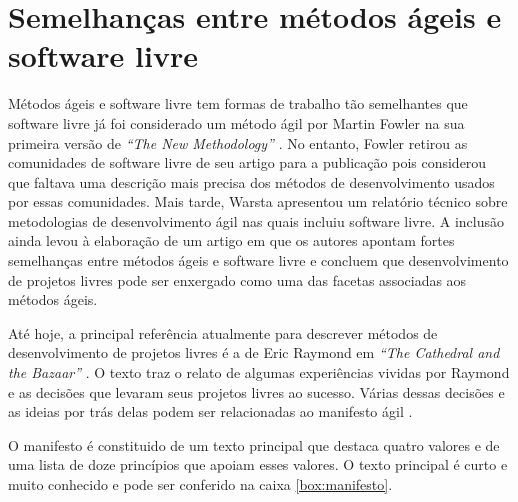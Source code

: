 \chapter{Semelhanças entre métodos ágeis e software livre}
\label{cap:semelhancas}

Métodos ágeis e software livre tem formas de trabalho tão semelhantes
que software livre já foi considerado um método ágil por Martin Fowler
na sua primeira versão de \emph{``The New Methodology''}
\cite{Fowler00orig}. No entanto, Fowler retirou as comunidades de
software livre de seu artigo para a publicação pois considerou que
faltava uma descrição mais precisa dos métodos de desenvolvimento
usados por essas comunidades. Mais tarde, Warsta \cite{Warsta2002}
apresentou um relatório técnico sobre metodologias de desenvolvimento
ágil nas quais incluiu software livre. A inclusão ainda levou à
elaboração de um artigo \cite{Warsta2003} em que os autores apontam
fortes semelhanças entre métodos ágeis e software livre e concluem que
desenvolvimento de projetos livres pode ser enxergado como uma das
facetas associadas aos métodos ágeis.

Até hoje, a principal referência atualmente para descrever métodos de
desenvolvimento de projetos livres é a de Eric Raymond em \emph{``The
  Cathedral and the Bazaar''} \cite{Raymond1999}. O texto traz o
relato de algumas experiências vividas por Raymond e as decisões que
levaram seus projetos livres ao sucesso. Várias dessas decisões e as
ideias por trás delas podem ser relacionadas ao manifesto ágil
\cite{AgileManifesto}.

O manifesto é constituido de um texto principal que destaca quatro
valores e de uma lista de doze princípios que apoiam esses valores. O
texto principal é curto e muito conhecido e pode ser conferido na
caixa \ref{box:manifesto}.

